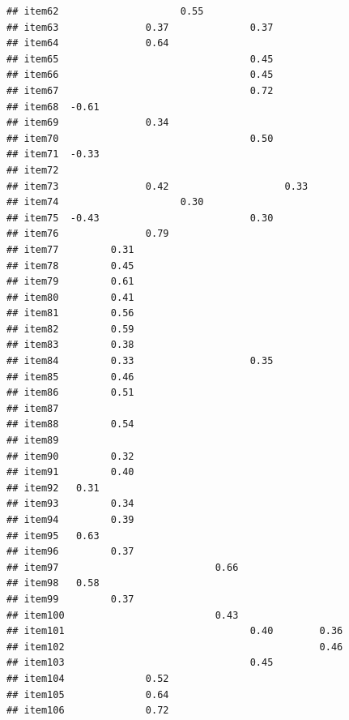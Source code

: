 \documentclass[
  english,
  man]{apa6}
\begin{document}
\begin{verbatim}
## item62                     0.55                        
## item63               0.37              0.37            
## item64               0.64                              
## item65                                 0.45            
## item66                                 0.45            
## item67                                 0.72            
## item68  -0.61                                          
## item69               0.34                              
## item70                                 0.50            
## item71  -0.33                                          
## item72                                                 
## item73               0.42                    0.33      
## item74                     0.30                        
## item75  -0.43                          0.30            
## item76               0.79                              
## item77         0.31                                    
## item78         0.45                                    
## item79         0.61                                    
## item80         0.41                                    
## item81         0.56                                    
## item82         0.59                                    
## item83         0.38                                    
## item84         0.33                    0.35            
## item85         0.46                                    
## item86         0.51                                    
## item87                                                 
## item88         0.54                                    
## item89                                                 
## item90         0.32                                    
## item91         0.40                                    
## item92   0.31                                          
## item93         0.34                                    
## item94         0.39                                    
## item95   0.63                                          
## item96         0.37                                    
## item97                           0.66                  
## item98   0.58                                          
## item99         0.37                                    
## item100                          0.43                  
## item101                                0.40        0.36
## item102                                            0.46
## item103                                0.45            
## item104              0.52                              
## item105              0.64                              
## item106              0.72                              

\end{verbatim}
\end{document}
